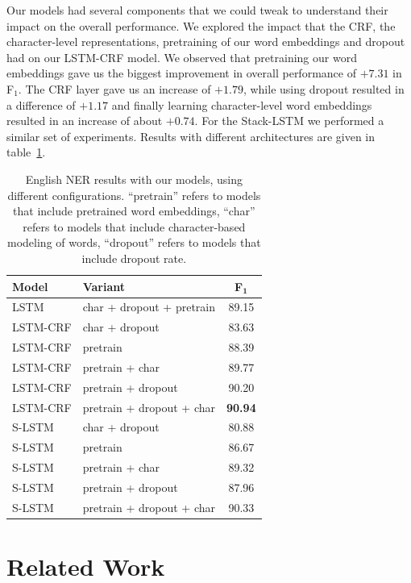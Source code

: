 \documentclass[11pt,letterpaper]{article}
\begin{document}
Our models had several components that we could tweak to understand their impact on the overall performance. We explored the impact that the CRF, the character-level representations, pretraining of our word embeddings and dropout had on our LSTM-CRF model. We observed that pretraining our word embeddings gave us the biggest improvement in overall performance of $+7.31$ in F$_1$. The CRF layer gave us an increase of $+1.79$, while using dropout resulted in a difference of $+1.17$ and finally learning character-level word embeddings resulted in an increase of about $+0.74$. For the Stack-LSTM we performed a similar set of experiments. Results with different architectures are given in table~\ref{results-diff-config}.

\begin{table}[h]
\centering
\begin{scriptsize}
\begin{tabular}{l|l|c}
\textbf{Model} & \textbf{Variant} & \textbf{F}${_{\mathbf{1}}}$\\
\hline
LSTM & char + dropout + pretrain & 89.15 \\
LSTM-CRF & char + dropout & 83.63 \\
LSTM-CRF & pretrain & 88.39 \\
LSTM-CRF & pretrain + char & 89.77 \\
LSTM-CRF & pretrain + dropout & 90.20 \\
LSTM-CRF & pretrain + dropout + char & \bf90.94 \\
\hline
S-LSTM & char + dropout & 80.88 \\
S-LSTM & pretrain & 86.67 \\
S-LSTM & pretrain + char & 89.32 \\
S-LSTM & pretrain + dropout & 87.96 \\
S-LSTM & pretrain + dropout + char & 90.33 \\
\end{tabular}
\end{scriptsize}
\caption{English NER results with our models, using different configurations. ``pretrain'' refers to models that include pretrained word embeddings, ``char'' refers to models that include character-based modeling of words, ``dropout'' refers to models that include dropout rate.}
\label{results-diff-config}
\end{table}%

\section{Related Work}
\label{relwork}
\end{document}

